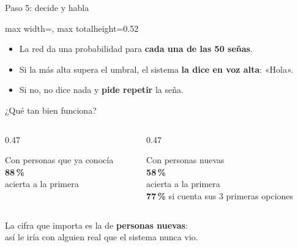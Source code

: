 \documentclass[aspectratio=169,11pt]{beamer}
\newcommand{\idea}[1]{\vfill\begin{center}\large #1\end{center}\vspace{0.2cm}}
\begin{document}
\begin{frame}{Paso 5: decide y habla}
  \vspace{0.3cm}
  \begin{center}
  \begin{adjustbox}{max width=\linewidth, max totalheight=0.52\textheight}\end{adjustbox}
  \end{center}
  \begin{itemize}\large
    \item La red da una probabilidad para \textbf{cada una de las 50 señas}.
    \item Si la más alta supera el umbral, el sistema \textbf{la dice en voz alta}: «Hola».
    \item Si no, no dice nada y \textbf{pide repetir} la seña.
  \end{itemize}
\end{frame}

\begin{frame}{¿Qué tan bien funciona?}
  \vspace{0.6cm}
  \begin{columns}[t]
  \begin{column}{0.47\textwidth}
    \begin{center}
      {\color{gris}\Large Con personas que ya conocía}\\[0.3cm]
      {\color{azul}\fontsize{60}{64}\selectfont\bfseries 88\,\%}\\[0.3cm]
      \large acierta a la primera
    \end{center}
  \end{column}
  \begin{column}{0.47\textwidth}
    \begin{center}
      {\color{gris}\Large Con personas nuevas}\\[0.3cm]
      {\color{naranja}\fontsize{60}{64}\selectfont\bfseries 58\,\%}\\[0.3cm]
      \large acierta a la primera\\ \textbf{77\,\%} si cuenta sus 3 primeras opciones
    \end{center}
  \end{column}
  \end{columns}
  \idea{La cifra que importa es la de \textbf{personas nuevas}:\\ así le iría con alguien real que el sistema nunca vio.}
\end{frame}
\end{document}
